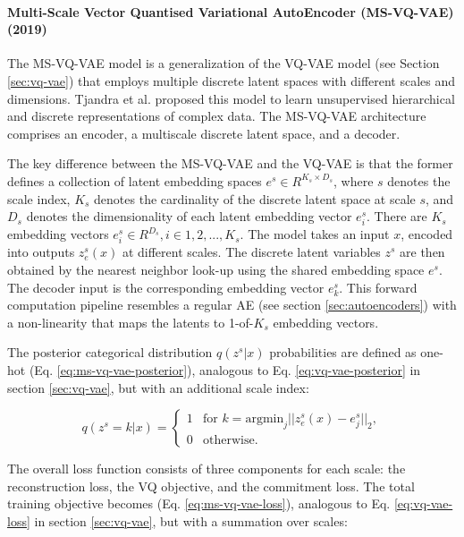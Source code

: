 \paragraph{Multi-Scale Vector Quantised Variational AutoEncoder (MS-VQ-VAE) (2019)} \label{sec:ms-vq-vae}

The \acf{MS-VQ-VAE} model is a generalization of the \ac{VQ-VAE} model (see Section \ref{sec:vq-vae}) that employs multiple discrete latent spaces with different scales and dimensions. Tjandra et al. proposed this model \cite{tjandra_vqvae_2019} to learn unsupervised hierarchical and discrete representations of complex data. The \ac{MS-VQ-VAE} architecture comprises an encoder, a multiscale discrete latent space, and a decoder.

The key difference between the \ac{MS-VQ-VAE} and the \ac{VQ-VAE} is that the former defines a collection of latent embedding spaces $e^s \in R^{K_s \times D_s}$, where $s$ denotes the scale index, $K_s$ denotes the cardinality of the discrete latent space at scale $s$, and $D_s$ denotes the dimensionality of each latent embedding vector $e^s_i$. There are $K_s$ embedding vectors $e^s_i \in R^{D_s}, i \in 1, 2, ..., K_s$. The model takes an input $x$, encoded into outputs $z_e^s(x)$ at different scales. The discrete latent variables $z^s$ are then obtained by the nearest neighbor look-up using the shared embedding space $e^s$. The decoder input is the corresponding embedding vector $e^s_k$. This forward computation pipeline resembles a regular \ac{AE} (see section \ref{sec:autoencoders}) with a non-linearity that maps the latents to 1-of-$K_s$ embedding vectors.

The posterior categorical distribution $q(z^s|x)$ probabilities are defined as one-hot (Eq. \ref{eq:ms-vq-vae-posterior}), analogous to Eq. \ref{eq:vq-vae-posterior} in section \ref{sec:vq-vae}, but with an additional scale index:

\begin{equation} \label{eq:ms-vq-vae-posterior}
 q(z^s = k|x) = \begin{cases}
 1 & \text{for } k = \text{argmin}_j ||z_e^s(x)-e^s_j||_2, \\
 0 & \text{otherwise}.
 \end{cases}
\end{equation}

The overall loss function consists of three components for each scale: the reconstruction loss, the VQ objective, and the commitment loss. The total training objective becomes (Eq. \ref{eq:ms-vq-vae-loss}), analogous to Eq. \ref{eq:vq-vae-loss} in section \ref{sec:vq-vae}, but with a summation over scales:


